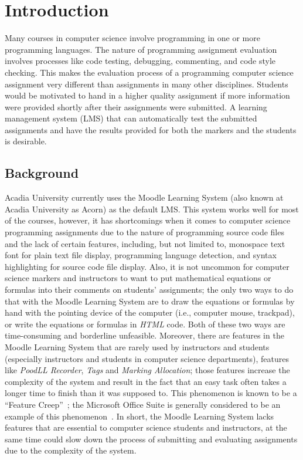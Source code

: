 

\chapter{Introduction}
\label{chap:INTRO}

Many courses in computer science involve programming in one or more programming
languages.
The nature of programming assignment evaluation
involves processes like code testing, debugging, commenting, and code style
checking.
This makes the evaluation process of a programming computer science assignment
very different than assignments in many other disciplines.
Students would be motivated to hand in a higher quality assignment
if more information were provided shortly after their assignments were
submitted.
A learning management system (LMS) that can automatically test the
submitted assignments and have the results provided for both the markers and
the students is desirable.

\section{Background}

Acadia University currently uses the Moodle Learning System (also known at 
Acadia University as Acorn) as the default LMS.
This system works well for most of the courses, however, it has shortcomings
when it comes to computer science programming assignments due to
the nature of programming source code files and the lack of certain
features, including, but not limited to, monospace text font for plain text
file display, programming language detection, and syntax
highlighting for source code file display.
Also, it is not uncommon for computer science markers and instructors
to want to put mathematical equations or formulas into their comments on
students' assignments; the only two ways to do that with the Moodle
Learning System are to draw the equations or formulas by hand with the
pointing device of the computer (i.e., computer mouse, trackpad), or write
the equations or formulas in \emph{HTML} code. Both of these two ways are
time-consuming and borderline unfeasible.
Moreover, there are features in the Moodle Learning System that are rarely
used by instructors and students (especially instructors and students in
computer science departments), features like \emph{PoodLL Recorder},
\emph{Tags} and \emph{Marking Allocation};
those features increase the
complexity of the system and result in the fact that an easy task 
often takes a longer time to finish than it was supposed to. This phenomenon
is known to be a ``Feature Creep''~\cite{featureCreep};
the Microsoft Office Suite is generally
considered to be an example of this phenomenon~\cite{msFeatureCreep}.
In short, the Moodle Learning System lacks features that are essential
to computer science students and instructors, at the same time could slow
down the process of submitting and evaluating assignments due to the complexity
of the system.

